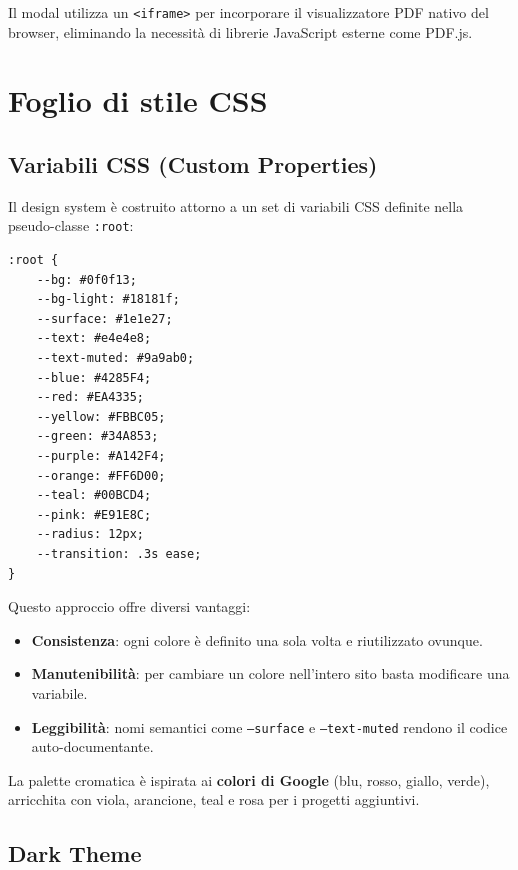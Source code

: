 \documentclass[a4paper,12pt]{report}
\begin{document}
Il modal utilizza un \texttt{<iframe>} per incorporare il visualizzatore PDF nativo del browser, eliminando la necessit\`a di librerie JavaScript esterne come PDF.js.


\chapter{Foglio di stile CSS}

\section{Variabili CSS (Custom Properties)}

Il design system \`e costruito attorno a un set di variabili CSS definite nella pseudo-classe \texttt{:root}:

\begin{lstlisting}[style=cssstyle, caption={Variabili CSS}]
:root {
    --bg: #0f0f13;
    --bg-light: #18181f;
    --surface: #1e1e27;
    --text: #e4e4e8;
    --text-muted: #9a9ab0;
    --blue: #4285F4;
    --red: #EA4335;
    --yellow: #FBBC05;
    --green: #34A853;
    --purple: #A142F4;
    --orange: #FF6D00;
    --teal: #00BCD4;
    --pink: #E91E8C;
    --radius: 12px;
    --transition: .3s ease;
}
\end{lstlisting}

Questo approccio offre diversi vantaggi:
\begin{itemize}[leftmargin=2cm]
    \item \textbf{Consistenza}: ogni colore \`e definito una sola volta e riutilizzato ovunque.
    \item \textbf{Manutenibilit\`a}: per cambiare un colore nell'intero sito basta modificare una variabile.
    \item \textbf{Leggibilit\`a}: nomi semantici come \texttt{--surface} e \texttt{--text-muted} rendono il codice auto-documentante.
\end{itemize}

La palette cromatica \`e ispirata ai \textbf{colori di Google} (blu, rosso, giallo, verde), arricchita con viola, arancione, teal e rosa per i progetti aggiuntivi.

\section{Dark Theme}
\end{document}
